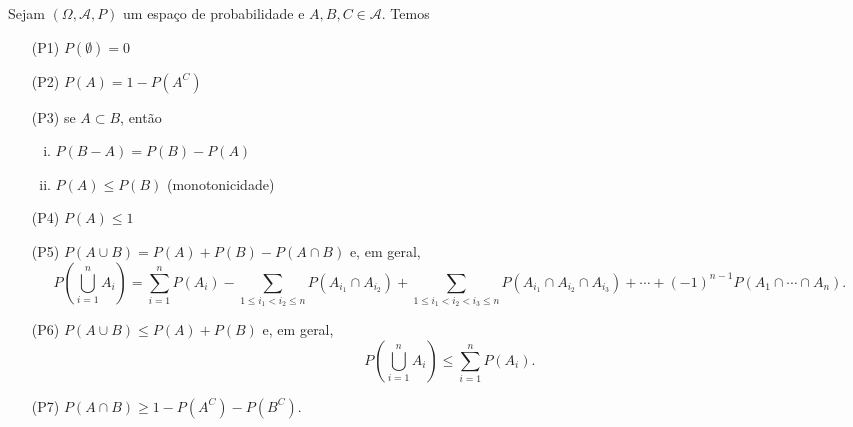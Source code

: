 \documentclass[../Notas.tex]{subfiles}
\begin{document}
\begin{proposition}
Sejam $(\Omega, \mathcal{A}, P)$ um espaço de probabilidade e $A, B, C \in\mathcal{A}$. Temos
\begin{itemize}
    \item[(P1)] $P(\emptyset) = 0$
    \item[(P2)] $P(A) = 1 - P(A^C)$
    \item[(P3)] se $A\subset B$, então
    \begin{enumerate}[(i)]
        \item $P(B-A) = P(B) - P(A)$
        \item $P(A) \leq P(B)$ (monotonicidade)
    \end{enumerate}
    \item[(P4)] $P(A) \leq 1$
    \item[(P5)] $P(A\cup B) = P(A) + P(B) - P(A\cap B)$ e, em geral,
    $$
    P\left( \bigcup_{i=1}^{n}A_i \right) = \sum_{i=1}^n P(A_i) - \sum_{1\leq i_1 < i_2 \leq n} P(A_{i_1}\cap A_{i_2}) + \sum_{1\leq i_1 < i_2 < i_3 \leq n} P(A_{i_1}\cap A_{i_2}\cap A_{i_3}) + \cdots + (-1)^{n-1}P(A_1\cap\cdots\cap A_n).
    $$
    \item[(P6)] $P(A\cup B)\leq P(A) + P(B)$ e, em geral,
    $$
    P\left( \bigcup_{i=1}^{n}A_i \right) \leq \sum_{i=1}^n P(A_i).
    $$
    \item[(P7)] $P(A\cap B) \geq 1 - P(A^C) - P(B^C)$.
\end{itemize}
\end{proposition}
\end{document}

